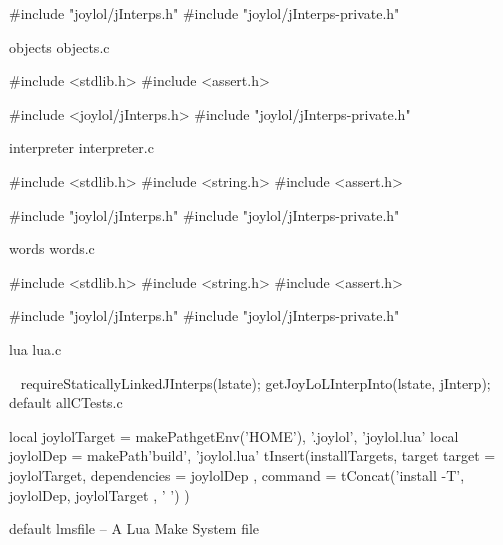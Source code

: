 #include "joylol/jInterps.h"
#include "joylol/jInterps-private.h"
\stopCCode

\createCCodeFile%
  {objects}%
  {objects.c}%
  {}

\startCCode
#include <stdlib.h>
#include <assert.h>

#include <joylol/jInterps.h>
#include "joylol/jInterps-private.h"
\stopCCode

\createCCodeFile%
  {interpreter}%
  {interpreter.c}%
  {}

\startCCode
#include <stdlib.h>
#include <string.h>
#include <assert.h>

#include "joylol/jInterps.h"
#include "joylol/jInterps-private.h"
\stopCCode

\createCCodeFile%
  {words}%
  {words.c}%
  {}

\startCCode
#include <stdlib.h>
#include <string.h>
#include <assert.h>

#include "joylol/jInterps.h"
#include "joylol/jInterps-private.h"
\stopCCode

\createCCodeFile%
  {lua}%
  {lua.c}%
  {}
  
\CTestsSetup\
\startCTest
  requireStaticallyLinkedJInterps(lstate);
  getJoyLoLInterpInto(lstate, jInterp);
\stopCTest
\createCTestFile%
  {default}%
  {allCTests.c}%
  {}


\startLmsfile
local joylolTarget = makePath{getEnv('HOME'), '.joylol', 'joylol.lua'}
local joylolDep    = makePath{'build', 'joylol.lua'}
tInsert(installTargets, target{
  target       = joylolTarget,
  dependencies = { joylolDep },
  command      = tConcat({'install -T', joylolDep, joylolTarget }, ' ')
})
\stopLmsfile




\createLmsfileFile%
  {default}%
  {lmsfile}%
  {-- A Lua Make System file}

